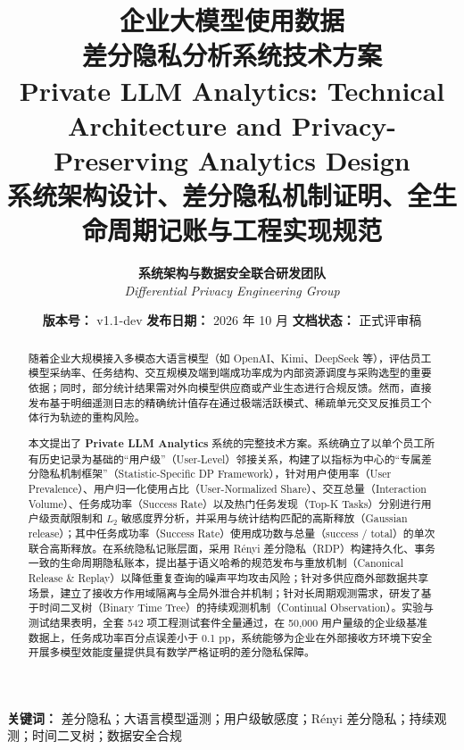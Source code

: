 \documentclass[UTF8,12pt,a4paper]{ctexart}
\title{
  \vspace{-1.5cm}
  {\Huge\bfseries\color{navyblue} 企业大模型使用数据\\[0.35cm]差分隐私分析系统技术方案}\\[0.6cm]
  {\large\bfseries\color{slateblue} Private LLM Analytics: Technical Architecture and Privacy-Preserving Analytics Design}\\[0.4cm]
  {\normalsize\color{darkgray} 系统架构设计、差分隐私机制证明、全生命周期记账与工程实现规范}
}
\author{
  \textbf{系统架构与数据安全联合研发团队} \\
  \textit{Differential Privacy Engineering Group}
}
\date{
  \vspace{0.4cm}
  \textbf{版本号：} v1.1-dev \quad\textbar\quad \textbf{发布日期：} 2026 年 10 月 \quad\textbar\quad \textbf{文档状态：} 正式评审稿
}
\begin{document}
\maketitle
\thispagestyle{empty}

\vspace{0.5cm}
\begin{abstract}
随着企业大规模接入多模态大语言模型（如 OpenAI、Kimi、DeepSeek 等），评估员工模型采纳率、任务结构、交互规模及端到端成功率成为内部资源调度与采购选型的重要依据；同时，部分统计结果需对外向模型供应商或产业生态进行合规反馈。然而，直接发布基于明细遥测日志的精确统计值存在通过极端活跃模式、稀疏单元交叉反推员工个体行为轨迹的重构风险。

本文提出了 \textbf{Private LLM Analytics} 系统的完整技术方案。系统确立了以单个员工所有历史记录为基础的“用户级”（User-Level）邻接关系，构建了以指标为中心的“专属差分隐私机制框架”（Statistic-Specific DP Framework），针对用户使用率（User Prevalence）、用户归一化使用占比（User-Normalized Share）、交互总量（Interaction Volume）、任务成功率（Success Rate）以及热门任务发现（Top-K Tasks）分别进行用户级贡献限制和 $L_2$ 敏感度界分析，并采用与统计结构匹配的高斯释放（Gaussian release）；其中任务成功率（Success Rate）使用成功数与总量（success / total）的单次联合高斯释放。在系统隐私记账层面，采用 Rényi 差分隐私（RDP）构建持久化、事务一致的生命周期隐私账本，提出基于语义哈希的规范发布与重放机制（Canonical Release \& Replay）以降低重复查询的噪声平均攻击风险；针对多供应商外部数据共享场景，建立了接收方作用域隔离与全局外泄合并机制；针对长周期观测需求，研发了基于时间二叉树（Binary Time Tree）的持续观测机制（Continual Observation）。实验与测试结果表明，全套 542 项工程测试套件全量通过，在 50,000 用户量级的企业级基准数据上，任务成功率百分点误差小于 0.1 pp，系统能够为企业在外部接收方环境下安全开展多模型效能度量提供具有数学严格证明的差分隐私保障。
\end{abstract}

\vspace{0.5cm}
\begin{center}
\small\textbf{关键词：} 差分隐私；大语言模型遥测；用户级敏感度；Rényi 差分隐私；持续观测；时间二叉树；数据安全合规
\end{center}

\newpage
\tableofcontents
\newpage
















\newpage



\newpage
\appendix



\end{document}
